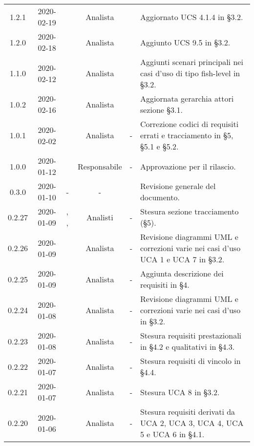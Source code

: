 {\begin{longtable}{ c c  C{2.5cm} c c C{3.5cm}}
1.2.1 & 2020-02-19 & \SE{} & Analista & \CE{} & Aggiornato UCS 4.1.4 in §3.2. \\

1.2.0 & 2020-02-18 & \DF{} & Analista & \CE{} & Aggiunto UCS 9.5 in §3.2. \\

1.1.0 & 2020-02-12 & \DF{} & Analista & \CE{} & Aggiunti scenari principali nei casi d'uso di tipo fish-level in §3.2. \\

1.0.2 & 2020-02-16 & \AT{} & Analista & \CE{} & Aggiornata gerarchia attori sezione §3.1. \\

1.0.1 & 2020-02-02 & \AT{} & Analista & - & Correzione codici di requisiti errati e tracciamento in §5, §5.1 e §5.2. \\

1.0.0 & 2020-01-12 & \AT{} & Responsabile & - & Approvazione per il rilascio. \\

0.3.0 & 2020-01-10 & - & - & \SE{} & Revisione generale del documento. \\

0.2.27 & 2020-01-09 & \CE{}, \PF{}, \DF{} & Analisti & - & Stesura sezione tracciamento (§5). \\

0.2.26 & 2020-01-09 & \PF{} & Analista & - & Revisione diagrammi UML e correzioni varie nei casi d'uso UCA 1 e UCA 7 in §3.2. \\

0.2.25 & 2020-01-09 & \CE{} & Analista & - & Aggiunta descrizione dei requisiti in §4. \\

0.2.24 & 2020-01-08 & \CE{} & Analista & - & Revisione diagrammi UML e correzioni varie nei casi d'uso in §3.2. \\

0.2.23 & 2020-01-08 & \DF{} & Analista & - & Stesura requisiti prestazionali in §4.2 e qualitativi in §4.3. \\

0.2.22 & 2020-01-07 & \PF{} & Analista & - & Stesura requisiti di vincolo in §4.4. \\

0.2.21 & 2020-01-07 & \PF{} & Analista & - & Stesura UCA 8 in §3.2. \\

0.2.20 & 2020-01-06 & \PF{} & Analista & - & Stesura requisiti derivati da UCA 2, UCA 3, UCA 4, UCA 5 e UCA 6 in §4.1. \\


\end{longtable}}
